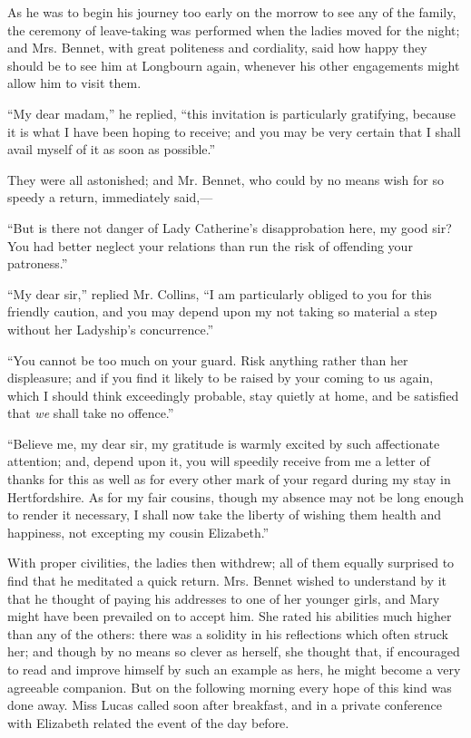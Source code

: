 As he was to begin his journey too early on the morrow to see any of the family, the ceremony of leave-taking was performed when the ladies moved for the night; and Mrs. Bennet, with great politeness and cordiality, said how happy they should be to see him at Longbourn again, whenever his other engagements might allow him to visit them.

``My dear madam,'' he replied, ``this invitation is particularly gratifying, because it is what I have been hoping to receive; and you may be very certain that I shall avail myself of it as soon as possible.''

They were all astonished; and Mr. Bennet, who could by no means wish for so speedy a return, immediately said,---

``But is there not danger of Lady Catherine's disapprobation here, my good sir? You had better neglect your relations than run the risk of offending your patroness.''

``My dear sir,'' replied Mr. Collins, ``I am particularly obliged to you for this friendly caution, and you may depend upon my not taking so material a step without her Ladyship's concurrence.''

``You cannot be too much on your guard. Risk anything rather than her displeasure; and if you find it likely to be raised by your coming to us again, which I should think exceedingly probable, stay quietly at home, and be satisfied that \textit{we} shall take no offence.''

``Believe me, my dear sir, my gratitude is warmly excited by such affectionate attention; and, depend upon it, you will speedily receive from me a letter of thanks for this as well as for every other mark of your regard during my stay in Hertfordshire. As for my fair cousins, though my absence may not be long enough to render it necessary, I shall now take the liberty of wishing them health and happiness, not excepting my cousin Elizabeth.''

With proper civilities, the ladies then withdrew; all of them equally surprised to find that he meditated a quick return. Mrs. Bennet wished to understand by it that he thought of paying his addresses to one of her younger girls, and Mary might have been prevailed on to accept him. She rated his abilities much higher than any of the others: there was a solidity in his reflections which often struck her; and though by no means so clever as herself, she thought that, if encouraged to read and improve himself by such an example as hers, he might become a very agreeable companion. But on the following morning every hope of this kind was done away. Miss Lucas called soon after breakfast, and in a private conference with Elizabeth related the event of the day before.


